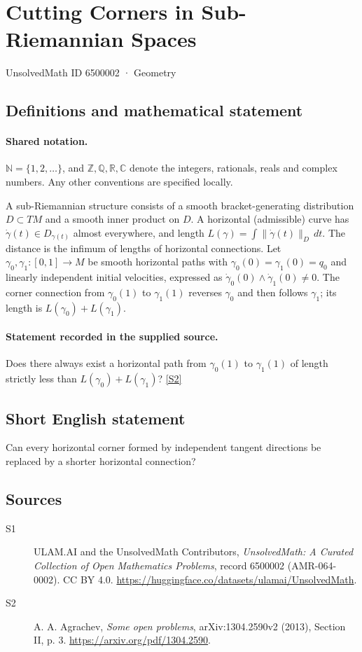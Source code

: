 \documentclass[11pt]{article}
\newcommand{\sref}[2]{\hyperlink{source:#1:#2}{[S#2]}}
\begin{document}
\setcounter{section}{6500001}
\section{Cutting Corners in Sub-Riemannian Spaces}\label{6500002}
{\small\sffamily UnsolvedMath ID 6500002 · Geometry}
\subsection{Definitions and mathematical statement}

\paragraph{Shared notation.}$\mathbb N=\{1,2,\ldots\}$, and $\mathbb Z,\mathbb Q,\mathbb R,\mathbb C$ denote the integers, rationals, reals and complex numbers. Any other conventions are specified locally.


A sub-Riemannian structure consists of a smooth bracket-generating distribution $D\subset TM$ and a smooth inner product on $D$. A horizontal (admissible) curve has $\dot\gamma(t)\in D_{\gamma(t)}$ almost everywhere, and length $L(\gamma)=\int\|\dot\gamma(t)\|_D\,dt$. The distance is the infimum of lengths of horizontal connections. Let $\gamma_0,\gamma_1:[0,1]\to M$ be smooth horizontal paths with $\gamma_0(0)=\gamma_1(0)=q_0$ and linearly independent initial velocities, expressed as $\dot\gamma_0(0)\wedge\dot\gamma_1(0)\ne0$. The corner connection from $\gamma_0(1)$ to $\gamma_1(1)$ reverses $\gamma_0$ and then follows $\gamma_1$; its length is $L(\gamma_0)+L(\gamma_1)$.
\paragraph{Statement recorded in the supplied source.}
Does there always exist a horizontal path from $\gamma_0(1)$ to $\gamma_1(1)$ of length strictly less than $L(\gamma_0)+L(\gamma_1)$? \sref{6500002}{2}
\subsection{Short English statement}
Can every horizontal corner formed by independent tangent directions be replaced by a shorter horizontal connection?
\subsection{Sources}
\begin{description}
\item[\hypertarget{source:6500002:1}{S1}] ULAM.AI and the UnsolvedMath Contributors, \emph{UnsolvedMath: A Curated Collection of Open Mathematics Problems}, record 6500002 (AMR-064-0002). CC BY 4.0. \url{https://huggingface.co/datasets/ulamai/UnsolvedMath}.
\item[\hypertarget{source:6500002:2}{S2}] A. A. Agrachev, \emph{Some open problems}, arXiv:1304.2590v2 (2013), Section II, p. 3. \url{https://arxiv.org/pdf/1304.2590}.
\end{description}
\label{end:6500002}
\end{document}
